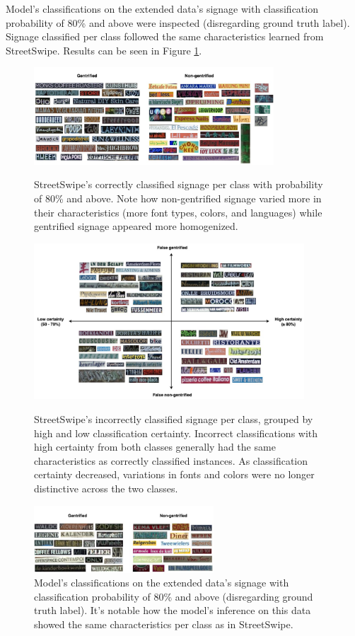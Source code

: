 Model's classifications on the extended data's signage with classification probability of 80\% and above were inspected (disregarding ground truth label). Signage classified per class followed the same characteristics learned from StreetSwipe. Results can be seen in Figure \ref{fig:output_vis_pano}.


\begin{figure}[]
    \centering
    \includegraphics[width=0.8\textwidth]{media/results/output_vis-SS_correct1.jpg}
        \caption{StreetSwipe's correctly classified signage per class with probability of 80\% and above. Note how non-gentrified signage varied more in their characteristics (more font types, colors, and languages) while gentrified signage appeared more homogenized.}
        \label{fig:output_vis}
    \includegraphics[width=0.9\textwidth]{media/results/output_vis-SS_incorrect.jpg}
        \caption{StreetSwipe's incorrectly classified signage per class, grouped by high and low classification certainty. Incorrect classifications with high certainty from both classes generally had the same characteristics as correctly classified instances. As classification certainty decreased, variations in fonts and colors were no longer distinctive across the two classes.}
        \label{fig:output_vis_SS_incorrect}
    \includegraphics[width=0.6\textwidth]{media/results/output_vis-pano1.jpg}
        \caption{Model's classifications on the extended data's signage with classification probability of 80\% and above (disregarding ground truth label). It's notable how the model's inference on this data showed the same characteristics per class as in StreetSwipe.}
        \label{fig:output_vis_pano}
\end{figure}